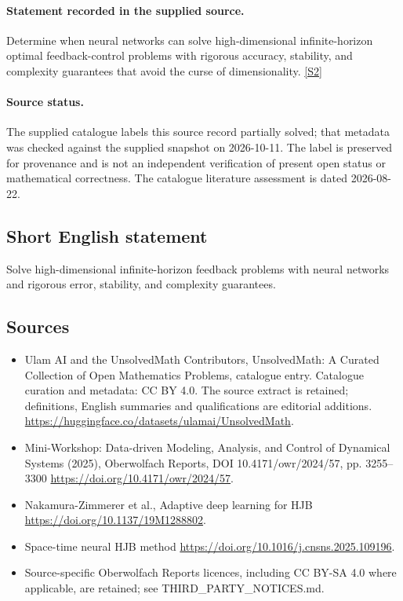 \documentclass[11pt]{article}
\begin{document}
\paragraph{Statement recorded in the supplied source.}
Determine when neural networks can solve high-dimensional infinite-horizon optimal feedback-control problems with rigorous accuracy, stability, and complexity guarantees that avoid the curse of dimensionality. \href{https://doi.org/10.4171/owr/2024/57}{[S2]}
\paragraph{Source status.}
The supplied catalogue labels this source record partially solved; that metadata was checked against the supplied snapshot on 2026-10-11. The label is preserved for provenance and is not an independent verification of present open status or mathematical correctness. The catalogue literature assessment is dated 2026-08-22.
\subsection{Short English statement}
Solve high-dimensional infinite-horizon feedback problems with neural networks and rigorous error, stability, and complexity guarantees.
\subsection{Sources}
\begin{itemize}
\item[S1] Ulam AI and the UnsolvedMath Contributors, UnsolvedMath: A Curated Collection of Open Mathematics Problems, catalogue entry. Catalogue curation and metadata: CC BY 4.0. The source extract is retained; definitions, English summaries and qualifications are editorial additions.
\url{https://huggingface.co/datasets/ulamai/UnsolvedMath}.
\item[S2] Mini-Workshop: Data-driven Modeling, Analysis, and Control of Dynamical Systems (2025), Oberwolfach Reports, DOI 10.4171/owr/2024/57, pp. 3255--3300
\url{https://doi.org/10.4171/owr/2024/57}.
\item[S3] Nakamura-Zimmerer et al., Adaptive deep learning for HJB
\url{https://doi.org/10.1137/19M1288802}.
\item[S4] Space-time neural HJB method
\url{https://doi.org/10.1016/j.cnsns.2025.109196}.
\item Source-specific Oberwolfach Reports licences, including CC BY-SA 4.0 where applicable, are retained; see THIRD\_PARTY\_NOTICES.md.
\end{itemize}
\end{document}
